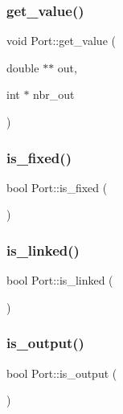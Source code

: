\mbox{\label{class_port_acc11e1890530dd4bc0b9e3c7778ef5ff}} 
\subsubsection{\texorpdfstring{get\+\_\+value()}{get\_value()}\hspace{0.1cm}{\footnotesize\ttfamily [2/2]}}
{\footnotesize\ttfamily void Port\+::get\+\_\+value (\begin{DoxyParamCaption}\item[{double $\ast$$\ast$}]{out,  }\item[{int $\ast$}]{nbr\+\_\+out }\end{DoxyParamCaption})\hspace{0.3cm}{\ttfamily [inline]}}

\mbox{\label{class_port_a7fbe40665570e0acbd7e9f6c9a8c9272}} 
\subsubsection{\texorpdfstring{is\+\_\+fixed()}{is\_fixed()}}
{\footnotesize\ttfamily bool Port\+::is\+\_\+fixed (\begin{DoxyParamCaption}{ }\end{DoxyParamCaption})}

\mbox{\label{class_port_a51a2db67f75c856f83d28cec818b0170}} 
\subsubsection{\texorpdfstring{is\+\_\+linked()}{is\_linked()}}
{\footnotesize\ttfamily bool Port\+::is\+\_\+linked (\begin{DoxyParamCaption}{ }\end{DoxyParamCaption})}

\mbox{\label{class_port_a0c7610af582f64a46f25f76f73de804c}} 
\subsubsection{\texorpdfstring{is\+\_\+output()}{is\_output()}}
{\footnotesize\ttfamily bool Port\+::is\+\_\+output (\begin{DoxyParamCaption}{ }\end{DoxyParamCaption})\hspace{0.3cm}{\ttfamily [inline]}}

